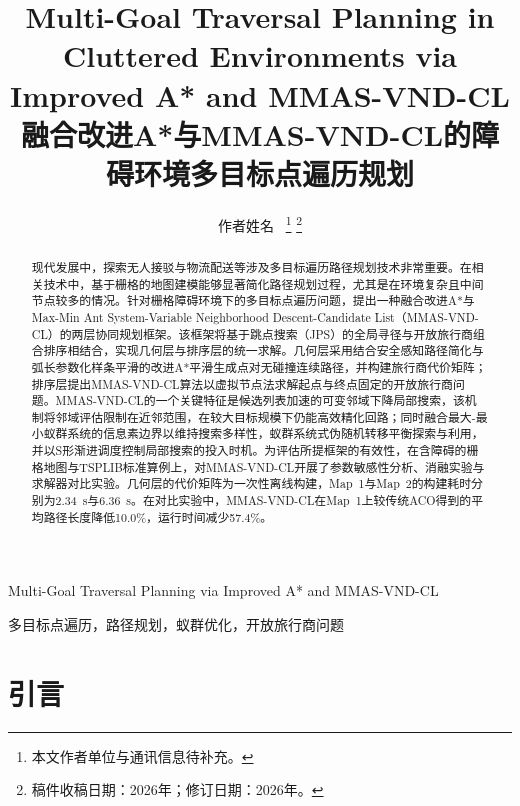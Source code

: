 \documentclass[lettersize,journal]{IEEEtran}
\begin{document}
\title{Multi-Goal Traversal Planning in Cluttered Environments via Improved A* and MMAS-VND-CL\\
{\normalsize 融合改进A*与MMAS-VND-CL的障碍环境多目标点遍历规划}}

\author{作者姓名~%
\thanks{本文作者单位与通讯信息待补充。}%
\thanks{稿件收稿日期：2026年；修订日期：2026年。}}

%
{Multi-Goal Traversal Planning via Improved A* and MMAS-VND-CL}

\maketitle

\begin{abstract}

现代发展中，探索无人接驳与物流配送等涉及多目标遍历路径规划技术非常重要。在相关技术中，基于栅格的地图建模能够显著简化路径规划过程，尤其是在环境复杂且中间节点较多的情况。针对栅格障碍环境下的多目标点遍历问题，提出一种融合改进A*与 Max-Min Ant System-Variable Neighborhood Descent-Candidate List（MMAS-VND-CL）的两层协同规划框架。该框架将基于跳点搜索（JPS）的全局寻径与开放旅行商组合排序相结合，实现几何层与排序层的统一求解。几何层采用结合安全感知路径简化与弧长参数化样条平滑的改进A*平滑生成点对无碰撞连续路径，并构建旅行商代价矩阵；排序层提出MMAS-VND-CL算法以虚拟节点法求解起点与终点固定的开放旅行商问题。MMAS-VND-CL的一个关键特征是候选列表加速的可变邻域下降局部搜索，该机制将邻域评估限制在近邻范围，在较大目标规模下仍能高效精化回路；同时融合最大-最小蚁群系统的信息素边界以维持搜索多样性，蚁群系统式伪随机转移平衡探索与利用，并以S形渐进调度控制局部搜索的投入时机。为评估所提框架的有效性，在含障碍的栅格地图与TSPLIB标准算例上，对MMAS-VND-CL开展了参数敏感性分析、消融实验与求解器对比实验。几何层的代价矩阵为一次性离线构建，Map~1与Map~2的构建耗时分别为2.34~s与6.36~s。在对比实验中，MMAS-VND-CL在Map~1上较传统ACO得到的平均路径长度降低10.0\%，运行时间减少57.4\%。

\end{abstract}

\begin{IEEEkeywords}

多目标点遍历，路径规划，蚁群优化，开放旅行商问题

\end{IEEEkeywords}

\section{引言}
\end{document}
